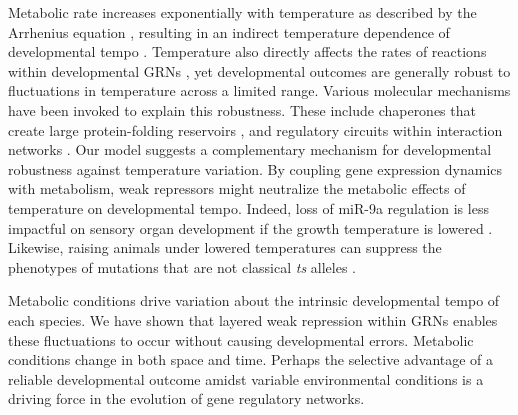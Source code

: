 Metabolic rate increases exponentially with temperature as described by the Arrhenius equation \cite{Zuo2011}, resulting in an indirect temperature dependence of developmental tempo \cite{Gillooly2002}. Temperature also directly affects the rates of reactions within developmental GRNs \cite{Zuo2011}, yet developmental outcomes are generally robust to fluctuations in temperature across a limited range. Various molecular mechanisms have been invoked to explain this robustness. These include chaperones that create large protein-folding reservoirs \cite{Jarosz2010,Rutherford1998}, and regulatory circuits within interaction networks \cite{Li2009}. Our model suggests a complementary mechanism for developmental robustness against temperature variation. By coupling gene expression dynamics with metabolism, weak repressors might neutralize the metabolic effects of temperature on developmental tempo. Indeed, loss of miR-9a regulation is less impactful on sensory organ development if the growth temperature is lowered \cite{Cassidy2013}. Likewise, raising animals under lowered temperatures can suppress the phenotypes of mutations that are not classical \textit{ts} alleles \cite{Child1935,Krafka1920,Lewis1980,Villee1943}.

Metabolic conditions drive variation about the intrinsic developmental tempo of each species. We have shown that layered weak repression within GRNs enables these fluctuations to occur without causing developmental errors. Metabolic conditions change in both space and time. Perhaps the selective advantage of a reliable developmental outcome amidst variable environmental conditions is a driving force in the evolution of gene regulatory networks.


